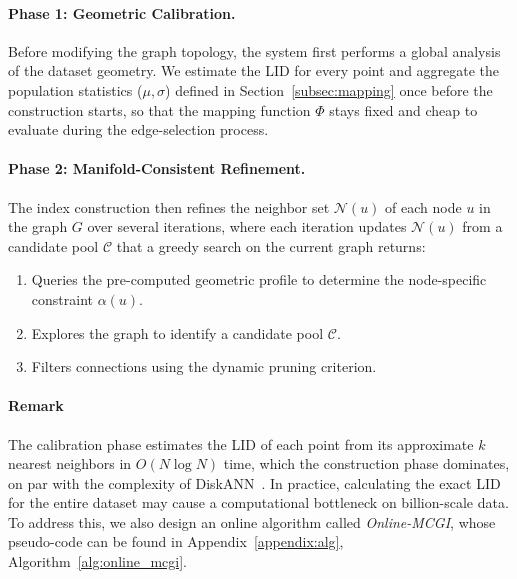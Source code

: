 \documentclass{article}
\theoremstyle{plain}
\theoremstyle{definition}
\theoremstyle{remark}
\begin{document}
\paragraph{Phase 1: Geometric Calibration.}
Before modifying the graph topology, the system first performs a global analysis of the dataset geometry. We estimate the LID for every point and aggregate the population statistics ($\mu, \sigma$) defined in Section~\ref{subsec:mapping} once before the construction starts, so that the mapping function $\Phi$ stays fixed and cheap to evaluate during the edge-selection process.

\paragraph{Phase 2: Manifold-Consistent Refinement.}
The index construction then refines the neighbor set $\mathcal{N}(u)$ of each node $u$ in the graph $G$ over several iterations, where each iteration updates $\mathcal{N}(u)$ from a candidate pool $\mathcal{C}$ that a greedy search on the current graph returns:
\begin{enumerate}
    \item Queries the pre-computed geometric profile to determine the node-specific constraint $\alpha(u)$.
    \item Explores the graph to identify a candidate pool $\mathcal{C}$.
    \item Filters connections using the dynamic pruning criterion. 
\end{enumerate}

\paragraph{Remark} The calibration phase estimates the LID of each point from its approximate $k$ nearest neighbors in $O(N \log N)$ time, which the construction phase dominates, on par with the complexity of DiskANN~\cite{subramanya2019diskann}.
In practice, calculating the exact LID for the entire dataset may cause a computational bottleneck on billion-scale data. 
To address this, we also design an online algorithm called \textit{Online-MCGI}, whose pseudo-code can be found in Appendix~\ref{appendix:alg}, Algorithm~\ref{alg:online_mcgi}.

\end{document}
